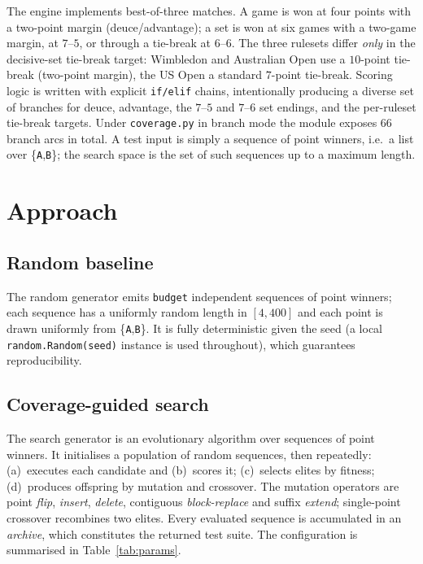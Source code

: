 \documentclass[conference]{IEEEtran}
\begin{document}
The engine implements best-of-three matches. A game is won at four points with a
two-point margin (deuce/advantage); a set is won at six games with a two-game
margin, at $7$--$5$, or through a tie-break at $6$--$6$. The three rulesets
differ \emph{only} in the decisive-set tie-break target: Wimbledon and
Australian Open use a $10$-point tie-break (two-point margin), the US Open a
standard $7$-point tie-break. Scoring logic is written with explicit
\texttt{if/elif} chains, intentionally producing a diverse set of branches for
deuce, advantage, the $7$--$5$ and $7$--$6$ set endings, and the per-ruleset
tie-break targets. Under \texttt{coverage.py} in branch mode the module exposes
66 branch arcs in total. A test input is simply a sequence of point winners,
i.e.\ a list over \{\texttt{A},\texttt{B}\}; the search space is the set of such
sequences up to a maximum length.

\section{Approach}

\subsection{Random baseline}
The random generator emits \texttt{budget} independent sequences of point
winners; each sequence has a uniformly random length in $[4, 400]$ and each
point is drawn uniformly from \{\texttt{A},\texttt{B}\}. It is fully
deterministic given the seed (a local \texttt{random.Random(seed)} instance is
used throughout), which guarantees reproducibility.

\subsection{Coverage-guided search}
The search generator is an evolutionary algorithm over sequences of point
winners. It initialises a population of random sequences, then repeatedly:
(a)~executes each candidate and (b)~scores it; (c)~selects elites by fitness;
(d)~produces offspring by mutation and crossover. The mutation operators are
point \emph{flip}, \emph{insert}, \emph{delete}, contiguous \emph{block-replace}
and suffix \emph{extend}; single-point crossover recombines two elites. Every
evaluated sequence is accumulated in an \emph{archive}, which constitutes the
returned test suite. The configuration is summarised in
Table~\ref{tab:params}.
\end{document}
